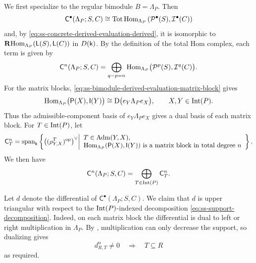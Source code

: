 We first specialize to the regular bimodule $B=\Lambda_P$.  Then
\begin{equation}
\label{eq:ss-regular-derived-evaluation}
\mathsf C^\bullet(\Lambda_P;S,C)
\cong
\operatorname{Tot}\operatorname{Hom}_{\Lambda_P}
\left(
\mathcal P^\bullet(S),
\mathcal I^\bullet(C)
\right)
\end{equation}
and, by \eqref{eq:ss-concrete-derived-evaluation-derived}, it is
isomorphic to $\mathbf R\!\operatorname{Hom}_{\Lambda_P}(\mathsf L(S),\mathsf L(C))$ in $D(\mathsf{k})$.
By the definition of the total Hom complex, each term is given by
\begin{equation}
\label{eq:ss-total-hom-term}
\mathsf C^n(\Lambda_P;S,C)
=
\bigoplus_{q-p=n}
\operatorname{Hom}_{\Lambda_P}
\bigl(
\mathcal P^p(S),
\mathcal I^q(C)
\bigr).
\end{equation}
For the matrix blocks,
\eqref{eq:ss-bimodule-derived-evaluation-matrix-block} gives
\begin{equation}
\label{eq:ss-derived-evaluation-matrix-block}
\operatorname{Hom}_{\Lambda_P}\bigl(\mathsf P(X),\mathsf I(Y)\bigr)
\cong
\mathrm D\bigl(e_Y\Lambda_Pe_X\bigr),
\qquad
X,Y\in\operatorname{Int}(P).
\end{equation}
Thus the admissible-component basis of $e_Y\Lambda_Pe_X$ gives a dual
basis of each matrix block.  For $T\in\operatorname{Int}(P)$, let
\begin{equation}
\label{eq:ss-support-component}
\mathsf C_T^n
=
\operatorname{span}_{\mathsf{k}}
\left\{
\bigl((\rho_{Y,X}^{T})^{\mathrm{op}}\bigr)^\vee
\middle| 
\begin{array}{l}
T\in\operatorname{Adm}(Y,X),\\
\operatorname{Hom}_{\Lambda_P}(\mathsf P(X),\mathsf I(Y))
\text{ is a matrix block in total degree }n
\end{array}
\right\}.
\end{equation}
We then
have
\begin{equation}
\label{eq:ss-support-decomposition}
\mathsf C^n(\Lambda_P;S,C)
=
\bigoplus_{T\in\operatorname{Int}(P)}
\mathsf C_T^n.
\end{equation}

Let $d$ denote the differential of
$\mathsf C^\bullet(\Lambda_P;S,C)$.  We claim that $d$ is upper
triangular with respect to the $\operatorname{Int}(P)$-indexed decomposition
\eqref{eq:ss-support-decomposition}.  Indeed, on each matrix block
the differential is dual to left or right multiplication in
$\Lambda_P$.  By ,
multiplication can only decrease the support, so dualizing gives
\begin{equation}
\label{eq:ss-support-upper-triangular}
d_{R,T}^n\neq0
\quad\Longrightarrow\quad
T\subseteq R
\end{equation}
as required. 

